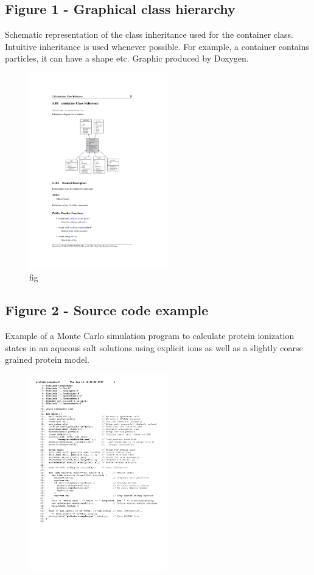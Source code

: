 \documentclass[10pt]{bmc_article}
\newenvironment{bmcformat}{\fussy\setboolean{publ}{true}}{\fussy}
\begin{document}
\begin{bmcformat}
  \subsection*{Figure 1 - Graphical class hierarchy}
      Schematic representation of the class inheritance used for the
      container class. Intuitive inheritance is used whenever possible.
      For example, a container contains particles, it can have a shape
      etc. Graphic produced by Doxygen.
      \begin{figure}[ht]\center
      \includegraphics[width=6cm]{pics/container}
      \caption{fig}
      \label{fig:container}
	\end{figure}

  \subsection*{Figure 2 - Source code example}
      Example of a Monte Carlo simulation program to calculate protein
      ionization states in an aqueous salt solutions using explicit ions as well as
      a slightly coarse grained protein model.
      \begin{figure}[ht]\center
      \includegraphics[width=6cm]{pics/source}
      \end{figure}
      

\end{bmcformat}
\end{document}
